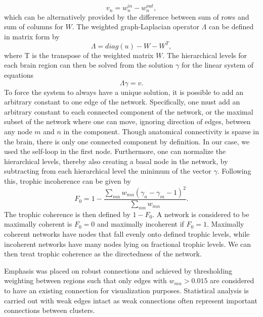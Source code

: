 \begin{equation}
v_n=w_n^{in}-w_n^{out},
\end{equation}
which can be alternatively provided by the difference between sum of
rows and sum of columns for \(W\). The weighted graph-Laplacian operator
\(\Lambda\) can be defined in matrix form by 
\begin{equation}
\Lambda = diag(u) - W - W^T,
\end{equation}
 where T is the transpose of the weighted matrix \(W\). The
hierarchical levels for each brain region can then be solved from the
solution \(\gamma\) for the linear system of equations 
\begin{equation}
\Lambda\gamma = v.
\end{equation}
To force the system to always have a unique solution, it is possible
to add an arbitrary constant to one edge of the network. Specifically,
one must add an arbitrary constant to each connected component of the
network, or the maximal subset of the network where one can move,
ignoring direction of edges, between any node \(m\) and \(n\) in the
component. Though anatomical connectivity is sparse in the brain, there
is only one connected component by definition. In our case, we used the
self-loop in the first node. Furthermore, one can normalize the
hierarchical levels, thereby also creating a basal node in the network,
by subtracting from each hierarchical level the minimum of the vector
\(\gamma\). Following this, trophic incoherence can be given by 
\begin{equation}
F_0=1-\frac{\sum_{mn}w_{mn}{(\gamma_n-\gamma_m-1)^2}}{\sum_{mn}{w_{mn}}}.
\end{equation}
The trophic coherence is then defined by \(1-F_0\). A network is
considered to be maximally coherent is \(F_0=0\) and maximally
incoherent if \(F_0=1\). Maximally coherent networks have nodes that
fall evenly onto defined trophic levels, while incoherent networks have
many nodes lying on fractional trophic levels. We can then treat trophic
coherence as the directedness of the network.

Emphasis was placed on robust connections and achieved by thresholding
weighting between regions such that only edges with \(w_{mn}>0.015\) are
considered to have an existing connection for visualization purposes.
Statistical analysis is carried out with weak edges intact as weak
connections often represent important connections between clusters.
